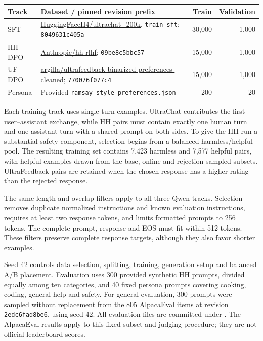 \documentclass[10pt,a4paper]{article}
\newcommand{\code}[1]{\texttt{\small\detokenize{#1}}}
\begin{document}
\begin{center}\small
\begin{tabularx}{\linewidth}{@{}lYrr@{}}\toprule
Track & Dataset / pinned revision prefix & Train & Validation\\\midrule
SFT & \href{https://huggingface.co/datasets/HuggingFaceH4/ultrachat_200k}{HuggingFaceH4/ultrachat\_200k}, \texttt{train\_sft}; \texttt{8049631c405a} & 30,000 & 1,000\\
HH DPO & \href{https://huggingface.co/datasets/Anthropic/hh-rlhf}{Anthropic/hh-rlhf}; \texttt{09be8c5bbc57} & 15,000 & 1,000\\
UF DPO & \href{https://huggingface.co/datasets/argilla/ultrafeedback-binarized-preferences-cleaned}{argilla/ultrafeedback-binarized-preferences-cleaned}; \texttt{770076f077c4} & 15,000 & 1,000\\
Persona & Provided \texttt{ramsay\_style\_preferences.json} & 200 & 20\\\bottomrule
\end{tabularx}
\end{center}

Each training track uses single-turn examples. UltraChat contributes the first user--assistant exchange, while HH pairs must contain exactly one human turn and one assistant turn with a shared prompt on both sides. To give the HH run a substantial safety component, selection begins from a balanced harmless/helpful pool. The resulting training set contains 7,423 harmless and 7,577 helpful pairs, with helpful examples drawn from the base, online and rejection-sampled subsets. UltraFeedback pairs are retained when the chosen response has a higher rating than the rejected response.

The same length and overlap filters apply to all three Qwen tracks. Selection removes duplicate normalized instructions and known evaluation instructions, requires at least two response tokens, and limits formatted prompts to 256 tokens. The complete prompt, response and EOS must fit within 512 tokens. These filters preserve complete response targets, although they also favor shorter examples.

Seed 42 controls data selection, splitting, training, generation setup and balanced A/B placement. Evaluation uses 300 provided synthetic HH prompts, divided equally among ten categories, and 40 fixed persona prompts covering cooking, coding, general help and safety. For general evaluation, 300 prompts were sampled without replacement from the 805 AlpacaEval items at revision \texttt{2edc6fad8be6}, using seed 42. All evaluation files are committed under \code{eval_sets/}. The AlpacaEval results apply to this fixed subset and judging procedure; they are not official leaderboard scores.
\end{document}
